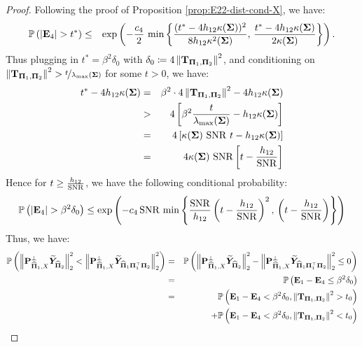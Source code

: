 \documentclass[numsec,webpdf,modern,medium,namedate]{oup-authoring-template}
\theoremstyle{thmstyleone}%
\theoremstyle{thmstyletwo}%
\theoremstyle{thmstylethree}%
\begin{document}
\begin{proof}
Following the proof of Proposition \ref{prop:E22-dist-cond-X}, we have:
\begin{eqnarray*}
    \mathbb{P} \left(  |\mathbf{E}_4|  > t^\ast \right)
    & \leq &  \exp \left( - \dfrac{c_{4}}{2} \, \min \left\{ \frac{(t^\ast-4h_{12} \kappa(\boldsymbol{\Sigma}))^2}{8h_{12}\kappa^2({\boldsymbol{\Sigma}})}, \, \frac{t^\ast -4h_{12} \kappa({\boldsymbol{\Sigma}})}{2\kappa({\boldsymbol{\Sigma}})} \right\} \right).
\end{eqnarray*}
Thus plugging in $t^\ast = \beta^2\delta_0$ with $\delta_0 \coloneq 4\left\|\mathbf{T}_{\boldsymbol{\Pi}_1, \boldsymbol{\Pi}_2} \right\|^2 $, and conditioning on $\left\|\mathbf{T}_{\boldsymbol{\Pi}_1, \boldsymbol{\Pi}_2} \right\|^2> \nicefrac{t}{\lambda_{\max}(\boldsymbol{\Sigma})}$ for some $t>0$, we have:
\begin{eqnarray*}
    t^\ast - 4h_{12}\kappa(\boldsymbol{\Sigma})
    & = & \beta^2 \cdot 4\left\|\mathbf{T}_{\boldsymbol{\Pi}_1, \boldsymbol{\Pi}_2} \right\|^2 - 4h_{12}\kappa(\boldsymbol{\Sigma})\\
    & > & 4\left[\beta^2 \dfrac{t}{\lambda_{\max}(\boldsymbol{\Sigma})} - h_{12}\kappa(\boldsymbol{\Sigma})\right]\\
    & = & 4\left[{\kappa(\boldsymbol{\Sigma})\ \mathrm{SNR}}\ t - h_{12}\kappa(\boldsymbol{\Sigma})\right]\\
    & = & 4\kappa(\boldsymbol{\Sigma})\ \mathrm{SNR}\left[t - \dfrac{h_{12}}{\mathrm{SNR}}\right]\\
\end{eqnarray*}
Hence for $t \geq \frac{h_{12}}{\mathrm{SNR}}$, we have the following conditional probability:
\begin{eqnarray*}
    \mathbb{P}\left(|\mathbf{E}_4| > \beta^2\delta_0\right)\leq  \exp \left( - c_{4} \, \mathrm{SNR} \, \min \left\{\frac{\mathrm{SNR}}{h_{12}}\left(t - \dfrac{h_{12}}{\mathrm{SNR}}\right)^2, \, \left(t - \dfrac{h_{12}}{\mathrm{SNR}}\right) \right\}\right)
\end{eqnarray*}
Thus, we have:
{\footnotesize
\begin{eqnarray*}
    \Prob\left(\left\| \bP_{\hatPi_1, X}^\perp \tilY_{{\hatPi_2}}\right\|_2^2 
< \left\| \bP_{\hatPi_1, X}^\perp \tilY_{\hatPi_1 \bPi_1^\top \bPi_2} \right\|_2^2\right) & = & \Prob\left(\left\| \bP_{\hatPi_1, X}^\perp \tilY_{{\hatPi_2}}\right\|_2^2 
- \left\| \bP_{\hatPi_1, X}^\perp \tilY_{\hatPi_1 \bPi_1^\top \bPi_2} \right\|_2^2\leq 0\right)\\
& = & \Prob\left(\bE_1 - \bE_4 \leq \beta^2\delta_0\right)\\
& = & \Prob\left(\bE_1 - \bE_4 < \beta^2\delta_0 , \left\|\bT_{\bPi_1, \bPi_2} \right\|^2 >  t_0\right) \\
        && + \Prob\left(\bE_1 - \bE_4 < \beta^2\delta_0 , \left\|\bT_{\bPi_1, \bPi_2} \right\|^2 <
         t_0\right)\\

\end{eqnarray*}}
\end{proof}
\end{document}
